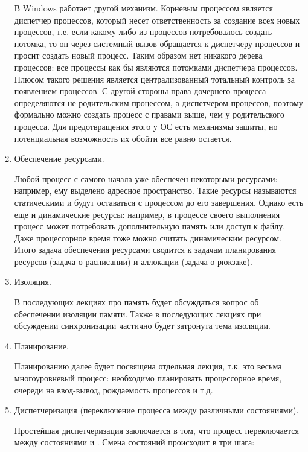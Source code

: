 \begin{enumerate}
  В Windows работает другой механизм. Корневым процессом является диспетчер
  процессов, который несет ответственность за создание всех новых процессов, т.е.
  если какому-либо из процессов потребовалось создать потомка, то он через
  системный вызов обращается к диспетчеру процессов и просит создать новый
  процесс. Таким образом нет никакого дерева процессов: все процессы как бы
  являются потомками диспетчера процессов. Плюсом такого решения является
  централизованный тотальный контроль за появлением процессов. С другой стороны
  права дочернего процесса определяются не родительским процессом, а диспетчером
  процессов, поэтому формально можно создать процесс с правами выше, чем у
  родительского процесса. Для предотвращения этого у ОС есть механизмы защиты,
  но потенциальная возможность их обойти все равно остается.

\item
  Обеспечение ресурсами.

  Любой процесс с самого начала уже обеспечен некоторыми ресурсами: например,
  ему выделено адресное пространство. Такие ресурсы называются статическими и
  будут оставаться с процессом до его завершения. Однако есть еще и динамические
  ресурсы: например, в процессе своего выполнения процесс может потребовать
  дополнительную память или доступ к файлу. Даже процессорное время тоже можно
  считать динамическим ресурсом. Итого задача обеспечения ресурсами сводится к
  задачам планирования ресурсов (задача о расписании) и аллокации (задача о
  рюкзаке).

\item
  Изоляция.

  В последующих лекциях про память будет обсуждаться вопрос об обеспечении
  изоляции памяти. Также в последующих лекциях при обсуждении синхронизации
  частично будет затронута тема изоляции.

\item
  Планирование.

  Планированию далее будет посвящена отдельная лекция, т.к. это весьма
  многоуровневый процесс: необходимо планировать процессорное время, очереди на
  ввод-вывод, рождаемость процессов и т.д.

\item
  Диспетчеризация (переключение процесса между различными состояниями).

  Простейшая диспетчеризация заключается в том, что процесс переключается между
  состояниями  и . Смена состояний происходит в три
  шага:


\end{enumerate}
